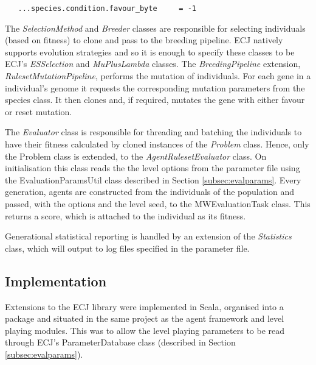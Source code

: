 \begin{minipage}{0.9\linewidth}
\centering
\begin{lstlisting}
   ...species.condition.favour_byte 	= -1
\end{lstlisting}
\end{minipage}


The \emph{SelectionMethod} and \emph{Breeder} classes are responsible for selecting individuals (based on fitness) to clone and pass to the breeding pipeline. ECJ natively supports evolution strategies and so it is enough to specify these classes to be ECJ's \emph{ESSelection} and \emph{MuPlusLambda} classes. The \emph{BreedingPipeline} extension, \emph{RulesetMutationPipeline}, performs the mutation of individuals. For each gene in a individual's genome it requests the corresponding mutation parameters from the species class. It then clones and, if required, mutates the gene with either favour or reset mutation. 

The \emph{Evaluator} class is responsible for threading and batching the individuals to have their fitness calculated by cloned instances of the \emph{Problem} class. Hence, only the Problem class is extended, to the \emph{AgentRulesetEvaluator} class. On initialisation this class reads the the level options from the parameter file using the EvaluationParamsUtil class described in Section \ref{subsec:evalparams}. Every generation, agents are constructed from the individuals of the population and passed, with the options and the level seed, to the MWEvaluationTask class. This returns a score, which is attached to the individual as its fitness.

Generational statistical reporting is handled by an extension of the \emph{Statistics} class, which will output to log files specified in the parameter file.




\subsection{Implementation}

Extensions to the ECJ library were implemented in Scala, organised into a package and situated in the same project as the agent framework and level playing modules. This was to allow the level playing parameters to be read through ECJ's ParameterDatabase class (described in Section \ref{subsec:evalparams}).


